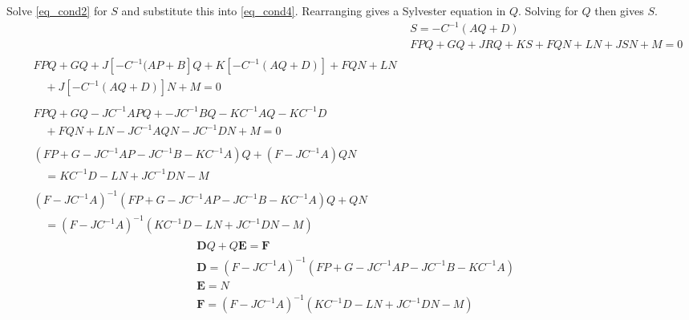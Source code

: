 \documentclass[letterpaper,12pt]{article}
\begin{document}
\begin{spacing}{1.5}
Solve \eqref{eq_cond2} for $S$ and substitute this into \eqref{eq_cond4}.  Rearranging gives a Sylvester equation in $Q$.  Solving for $Q$ then gives $S$.
\begin{align}
	& S = -C^{-1} (AQ + D) \nonumber \\
	& FPQ + GQ + JRQ + KS + FQN + LN + JSN + M = 0 \nonumber \\
	\begin{split} & FPQ + GQ + J[-C^{-1} (AP + B]Q + K[-C^{-1} (AQ + D)] + FQN + LN \\ & \quad + J[-C^{-1} (AQ + D)]N + M = 0 \end{split} \nonumber \\
	\begin{split} & FPQ + GQ - J C^{-1} APQ+ - J C^{-1} BQ - K C^{-1} AQ - K C^{-1} D \\ & \quad + FQN + LN - J C^{-1} AQN - J C^{-1} DN + M = 0 \end{split} \nonumber \\
	\begin{split} & (FP + G - JC^{-1}AP - JC^{-1}B - KC^{-1}A ) Q + (F - JC^{-1}A) Q N \\ & \quad = K C^{-1} D - LN + J C^{-1} DN - M \end{split} \nonumber \\
	\begin{split} & (F - JC^{-1}A)^{-1} (FP + G - JC^{-1}AP - JC^{-1}B - KC^{-1}A ) Q +  Q N \\ & \quad = (F - JC^{-1}A)^{-1} (K C^{-1} D - LN + J C^{-1} DN - M) \end{split}
\end{align}
\begin{align}
	& \mathbf{D} Q + Q \mathbf{E} = \mathbf{F}  \nonumber \\
	& \mathbf{D} = (F - JC^{-1}A)^{-1} (FP + G - JC^{-1}AP - JC^{-1}B - KC^{-1}A ) \nonumber \\
	& \mathbf{E} = N \nonumber \\
	& \mathbf{F} = (F - JC^{-1}A)^{-1} (K C^{-1} D - LN + J C^{-1} DN - M) \nonumber
\end{align}

\end{spacing}
\end{document}
